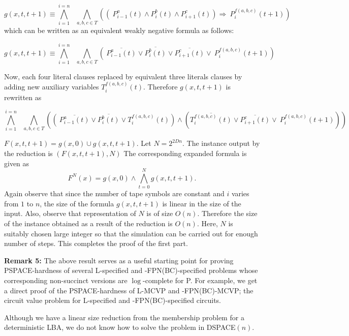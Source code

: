 \[g(x, t,t+1) \equiv  \bigwedge_{i =1}^{ i = n} ~~~ \bigwedge_{a,b,c \in T} 
\left(\left(~P_{i-1}^{a}(t) \wedge P_{i}^{b}(t) \wedge 
P_{i+1}^{c}(t) \right) \Rightarrow ~P_{i}^{f(a,b,c)}(t+1) \right) \]
which can be written as an equivalent weakly negative formula as follows:

\[g(x, t,t+1) \equiv  \bigwedge_{i =1}^{ i = n} ~~~ \bigwedge_{a,b,c \in T} 
\left(~\overline{P_{i-1}^{a}(t)} \vee \overline{P_{i}^{b}(t)}
\vee \overline{P_{i+1}^{c}(t)}  \vee ~P_{i}^{f(a,b,c)}(t+1) \right) \]

Now, each four literal clauses replaced by equivalent three literals clauses
by adding new auxiliary variables $T^{f(a,b,c)}_{i}(t)$. Therefore
$g(x, t,t+1)$  is rewritten as 

\[ \bigwedge_{i =1}^{ i = n} ~~~ \bigwedge_{a,b,c \in T} 
\left(
\left(~\overline{P_{i-1}^{a}(t)} \vee \overline{P_{i}^{b}(t)}
\vee T_{i}^{f(a,b,c)}(t) \right)
\wedge 
\left( \overline{T_{i}^{f(a,b,c)}(t)} \vee
\overline{P_{i+1}^{c}(t)}  \vee ~P_{i}^{f(a,b,c)}(t+1) \right)\right) \]


$F(x,t,t+1) = g(x, 0) \cup g(x,t, t+1)$. Let $N = 2^{2Dn}$.
The instance output by the reduction is $(F(x,t, t+1), N)$
The corresponding expanded formula is given as 
\[ F^N(x) = g(x, 0) \wedge \bigwedge_{t = 0}^{N}g(x, t, t+1). \] 
Again observe that since the number of tape symbols are constant and $i$ 
varies  from $1$ to $n$,  
the size of the formula $g(x, t, t+1)$ is linear in the size of the input.
Also, observe that representation of $N$ is of size $O(n)$. Therefore
the size of the instance obtained as a result of the reduction is $O(n)$.
Here, 
$N$ is suitably chosen large integer so that the simulation can be carried 
out for enough number of steps. This completes the proof of the 
first part.\QED
\fi

\smallskip

\noindent
{\bf Remark 5:}
The above result serves as a useful starting point for proving 
{\sf PSPACE}-hardness of several {\sf L}-specified 
and {-FPN(BC)}-specified 
problems whose corresponding non-succinct versions are $\log$-complete
for {\sf P}. For example, we get a direct proof of the {\sf PSPACE}-hardness
of {\sf L-MCVP} and {-FPN(BC)-MCVP}; 
the circuit value problem for {\sf L}-specified and {-FPN(BC)}-specified
circuits.


Although we have a linear size reduction from the membership problem for
a deterministic {\sf LBA}, we do not know how to solve the problem in 
{\sf DSPACE$(n)$}.
